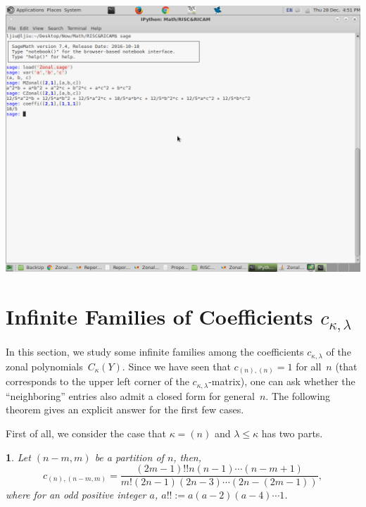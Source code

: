 \documentclass[10pt,oneside,american]{amsart}
\numberwithin{equation}{section}
\numberwithin{figure}{section}
\theoremstyle{definition}
\theoremstyle{remark}
\theoremstyle{plain}
\theoremstyle{definition}
\theoremstyle{plain}
\newtheorem{thm}{\protect\theoremname}[section]
\theoremstyle{plain}
\theoremstyle{plain}
\providecommand{\theoremname}{Theorem}
\begin{document}
\includegraphics[scale=0.3]{ScreenShot}


\section{Infinite Families of Coefficients $c_{\kappa,\lambda}$}

In this section, we study some infinite families among the coefficients
$c_{\kappa,\lambda}$ of the zonal polynomials~$C_{\kappa}(Y)$. Since we have
seen that $c_{(n),(n)}=1$ for all~$n$ (that corresponds to the upper left
corner of the $c_{\kappa,\lambda}$-matrix), one can ask whether the
``neighboring'' entries also admit a closed form for general~$n$.  The
following theorem gives an explicit answer for the first few cases.

First of all, we consider the case that $\kappa=\left(n\right)$ and $\lambda\leq\kappa$ has two parts.

\begin{thm}
Let $\left(n-m,m\right)$ be a partition of $n$, then, 
\begin{equation}
c_{\left(n\right),\left(n-m,m\right)}=\frac{\left(2m-1\right)!!n\left(n-1\right)\cdots\left(n-m+1\right)}{m!\left(2n-1\right)\left(2n-3\right)\cdots\left(2n-\left(2m-1\right)\right)} \label{eq:1to2},
\end{equation}
where for an odd positive integer $a$, $a!!:=a\left(a-2\right)\left(a-4\right)\cdots1$. 
\end{thm}
\end{document}
